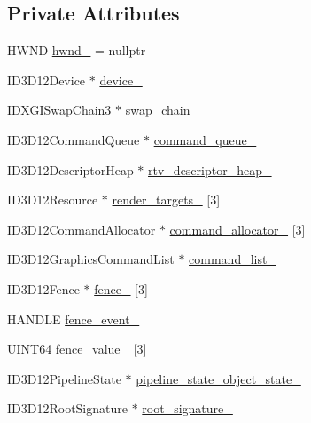 \subsection*{Private Attributes}
\begin{DoxyCompactItemize}
\item 
H\+W\+ND \mbox{\hyperlink{classd3dx12__application_a2bc9643a52b73ad736cb566763df6d52}{hwnd\+\_\+}} = nullptr
\item 
I\+D3\+D12\+Device $\ast$ \mbox{\hyperlink{classd3dx12__application_ab7e2b19372fb1c9f0d0de3c8090b0fe7}{device\+\_\+}}
\item 
I\+D\+X\+G\+I\+Swap\+Chain3 $\ast$ \mbox{\hyperlink{classd3dx12__application_ab81e4a71aaceebe670c38ea5931d7c4f}{swap\+\_\+chain\+\_\+}}
\item 
I\+D3\+D12\+Command\+Queue $\ast$ \mbox{\hyperlink{classd3dx12__application_a3d1b06ead76895d8cc54918a42b9a9c1}{command\+\_\+queue\+\_\+}}
\item 
I\+D3\+D12\+Descriptor\+Heap $\ast$ \mbox{\hyperlink{classd3dx12__application_ac7da8bb64d2c548b8662de17ea596fdf}{rtv\+\_\+descriptor\+\_\+heap\+\_\+}}
\item 
I\+D3\+D12\+Resource $\ast$ \mbox{\hyperlink{classd3dx12__application_a548109d54a2b4edf4f902d91899c8830}{render\+\_\+targets\+\_\+}} \mbox{[}3\mbox{]}
\item 
I\+D3\+D12\+Command\+Allocator $\ast$ \mbox{\hyperlink{classd3dx12__application_a04f68df0faf2e091acd9485fc92ca287}{command\+\_\+allocator\+\_\+}} \mbox{[}3\mbox{]}
\item 
I\+D3\+D12\+Graphics\+Command\+List $\ast$ \mbox{\hyperlink{classd3dx12__application_aabe4a77ad982172f0e3ee4b9ddcafc82}{command\+\_\+list\+\_\+}}
\item 
I\+D3\+D12\+Fence $\ast$ \mbox{\hyperlink{classd3dx12__application_aeebea9eaef7f0bfe014aadf43c6cc098}{fence\+\_\+}} \mbox{[}3\mbox{]}
\item 
H\+A\+N\+D\+LE \mbox{\hyperlink{classd3dx12__application_a6ca972b53ae95711d67e47ba266bd014}{fence\+\_\+event\+\_\+}}
\item 
U\+I\+N\+T64 \mbox{\hyperlink{classd3dx12__application_a4b6159dfc534b858719a8b274c3d42e0}{fence\+\_\+value\+\_\+}} \mbox{[}3\mbox{]}
\item 
I\+D3\+D12\+Pipeline\+State $\ast$ \mbox{\hyperlink{classd3dx12__application_abe5725448143a62d890690b068ff8343}{pipeline\+\_\+state\+\_\+object\+\_\+state\+\_\+}}
\item 
I\+D3\+D12\+Root\+Signature $\ast$ \mbox{\hyperlink{classd3dx12__application_a1378df560de88d39147c05099b1b03c4}{root\+\_\+signature\+\_\+}}

\end{DoxyCompactItemize}
